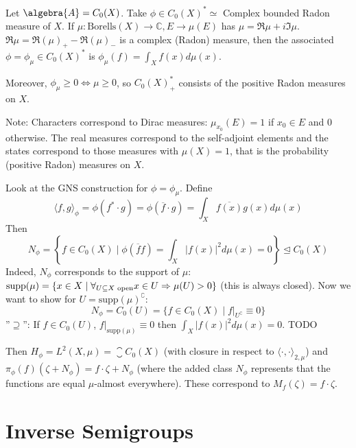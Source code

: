 \documentclass[a4paper]{article}
\begin{document}
\begin{example}
	Let $\algebra{A} = C_0(X)$. Take $\phi \in C_0(X)^* \simeq $ Complex bounded Radon measure of $X$.
		If $\mu: \mathrm{Borells} (X) \to \mathds{C}, E \to \mu(E)$ has $\mu = \Re{\mu} + i \Im{\mu}$.
		$\Re{\mu} = \Re(\mu)_+ - \Re(\mu)_-$ is a complex (Radon) measure, then the associated $\phi = \phi_\mu \in C_0(X)^*$ is $\phi_\mu(f) = \int_X f(x) d\mu(x)$.
		
		Moreover, $\phi_\mu \geq 0 \iff \mu \geq 0$, so $C_0(X)^*_+$ consists of the positive Radon measures on $X$.

		Note: Characters correspond to Dirac measures: $\mu_{x_0}(E) = 1$ if $x_0 \in E$ and $0$ otherwise.	The real measures correspond to the self-adjoint elements and the states correspond to those measures with $\mu(X) = 1$, that is the probability (positive Radon) measures on $X$.
\end{example}

\begin{remark}
	Look at the GNS construction for $\phi = \phi_\mu$. Define
	\begin{equation*}
		\langle f, g\rangle_\phi = \phi(f^* \cdot g) = \phi(\overline{f} \cdot g) = \int_X \overline{f(x)} g(x) d\mu(x)
	\end{equation*}
	Then 
	\begin{equation*}
		N_\phi = \left\{ f \in C_0(X) \mid \phi(\overline{f} f) = \int_X |f(x)|^2 d\mu(x) = 0 \right\} \trianglelefteq C_0(X)
	\end{equation*}
	Indeed, $N_\phi$ corresponds to the support of $\mu$: $\mathrm{supp}(\mu) = \{x \in X \mid \forall_{U \subseteq X \text{ open}} x \in U \Rightarrow \mu(U) > 0 \}$ (this is always closed). Now we want to show for $U = \mathrm{supp}(\mu)^\complement$:
	\begin{equation*}
		N_\phi = C_0(U) = \{ f \in C_0(X) \mid f|_{U^\complement} \equiv 0 \}
	\end{equation*}
	''$\supseteq$'': If $f \in C_0(U)$, $f|_{\mathrm{supp}(\mu)} \equiv 0$ then $\int_X |f(x)|^2 d \mu(x) = 0$. TODO

	
	Then $H_\phi = L^2(X, \mu) = \closure{C_0(X)}$ (with closure in respect to $\langle \cdot, \cdot \rangle_{2, \mu}$) and $\pi_\phi(f)(\zeta + N_\phi) = f \cdot \zeta + N_\phi$ (where the added class $N_\phi$ represents that the functions are equal $\mu$-almost everywhere).
	These correspond to $M_f(\zeta) = f \cdot \zeta$.
\end{remark}

\section{Inverse Semigroups}
\end{document}
